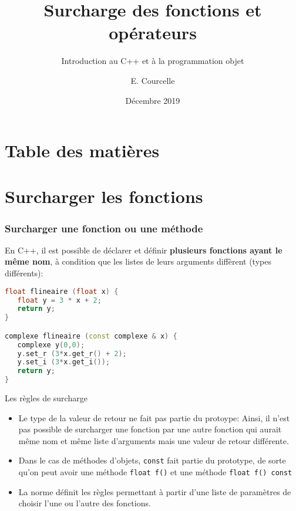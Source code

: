 \documentclass{beamer}
\title{Surcharge des fonctions et opérateurs}
\subtitle{Introduction au C++ et à la programmation objet}
\author{E. Courcelle}\institute{CALMIP, UMS 3669}
\date{Décembre 2019}
\begin{document}
\begin{frame}
\titlepage
\end{frame}

\section*{Table des matières}
\begin{frame}
\tableofcontents
\end{frame}


\section{Surcharger les fonctions}

\begin{frame}[fragile=singleslide,shrink=20]
\frametitle {Surcharger une fonction ou une méthode}

En C++, il est possible de déclarer et définir \textbf{plusieurs fonctions ayant le même nom}, à condition que les listes de leurs arguments diffèrent (types différents):

\begin{lstlisting}[language=c++]
float flineaire (float x) {                   
   float y = 3 * x + 2;
   return y;
}

complexe flineaire (const complexe & x) {
   complexe y(0,0);
   y.set_r (3*x.get_r() + 2);
   y.set_i (3*x.get_i());
   return y;
}
\end{lstlisting}

\begin{block}{Les règles de surcharge}
\begin{itemize}
\item{Le type de la valeur de retour ne fait pas partie du protoype: Ainsi, il n'est pas possible de surcharger une fonction par une autre fonction qui aurait même nom et même liste d'arguments mais une valeur de retour différente.}
\item{Dans le cas de méthodes d'objets, \texttt{const} fait partie du prototype, de sorte qu'on peut avoir une méthode \texttt{float f()} et une méthode \texttt{float f() const} }
\item{La norme définit les règles permettant à partir d'une liste de paramètres de choisir l'une ou l'autre des fonctions.}
\end{itemize}
\end{block}
\end{frame}
\end{document}
